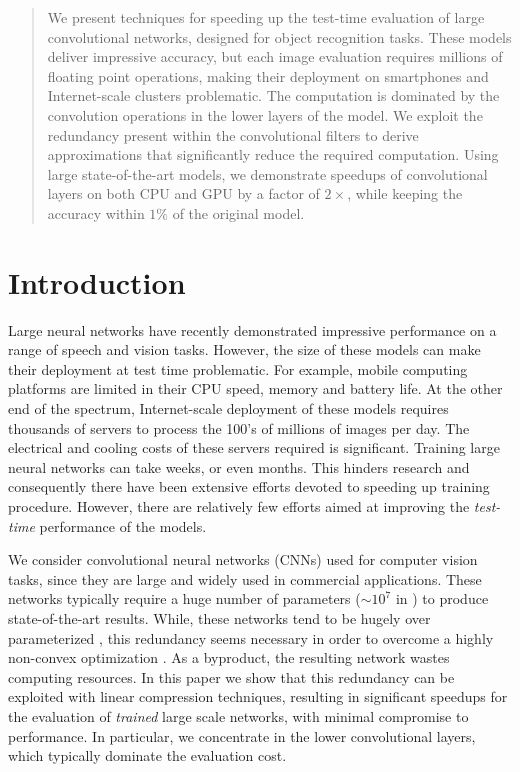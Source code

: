 \begin{abstract}
  We present techniques for speeding up the test-time evaluation of
  large convolutional networks, designed for object recognition
  tasks. These models deliver impressive accuracy, but each image
  evaluation requires millions of floating point operations, making
  their deployment on smartphones and Internet-scale clusters
  problematic. The computation is dominated by the convolution
  operations in the lower layers of the model. We exploit the redundancy
  present within the convolutional filters to derive
  approximations that significantly reduce the required
  computation. Using large state-of-the-art models, we demonstrate
  speedups of convolutional layers on both CPU and GPU by a factor of $2\times$, while keeping the accuracy
  within $1\%$ of the original model.
\end{abstract}

\section{Introduction}

Large neural networks have recently demonstrated impressive
performance on a range of speech and vision tasks. However, the size of
these models can make their deployment at test time problematic. For
example, mobile computing platforms are limited in their CPU speed,
memory and battery life. At the other end of the spectrum,
Internet-scale deployment of these models requires thousands of
servers to process the 100's of millions of images per day. The
electrical and cooling costs of these servers required is significant.
Training large neural networks can take weeks, or even
months. This hinders research and consequently there have been
extensive efforts devoted to speeding up training procedure.  However,
there are relatively few efforts aimed at improving the {\em test-time}
performance of the models. 

 We consider convolutional neural networks (CNNs) used for computer vision tasks, since
they are large and widely used in commercial applications. 
These networks typically require a huge number of parameters ($\sim 10^{7}$ in \cite{sermanet2013overfeat})
to produce state-of-the-art results. 
While, these networks tend to be hugely over parameterized \cite{denil2013predicting}, this redundancy seems necessary in order
to overcome a highly non-convex optimization \cite{hinton2012improving}. 
As a byproduct, the resulting network wastes computing resources.
In this paper we show that this redundancy can be 
exploited with linear compression techniques,
resulting in significant speedups for the evaluation of {\em trained}
large scale networks, with minimal compromise to performance.
In particular, we concentrate in the lower convolutional layers, which 
typically dominate the evaluation cost. 

